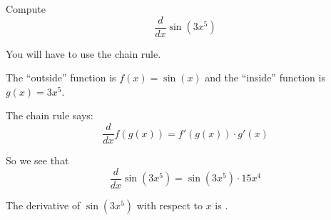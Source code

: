 \begin{question}
  Compute
  \[
  \frac{d}{dx} \sin(3x^5)
  \]
  \begin{solution}
    \begin{hint}
      You will have to use the chain rule.
    \end{hint}
    \begin{hint}
      The ``outside'' function is $f(x) = \sin(x)$ and the ``inside''
      function is $g(x) = 3x^5$.
    \end{hint}
    \begin{hint}
      The chain rule says:
      \[
      \frac{d}{dx} f(g(x)) = f'(g(x))\cdot g'(x)
      \]
    \end{hint}
    \begin{hint}
      So we see that
      \[
      \frac{d}{dx} \sin(3x^5) = \sin(3x^5) \cdot 15 x^4
      \]
    \end{hint}
    The derivative of $\sin(3x^5)$ with respect to $x$ is
    .
  \end{solution}
\end{question}
